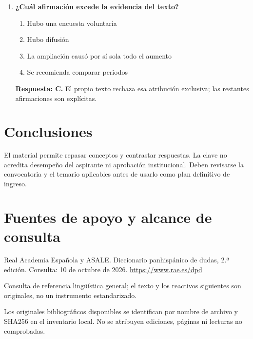 \begin{enumerate}
\begin{enumerate}[label=\Alph*)]
\item El horario no tuvo efecto alguno
\item Los costos fueron nulos
\end{enumerate}
\textbf{Respuesta: B.} Se reconoce una contribución posible, no resultados definitivos ni absolutos.
\item\textbf{¿Cuál afirmación excede la evidencia del texto?}
\begin{enumerate}[label=\Alph*)]
\item Hubo una encuesta voluntaria
\item Hubo difusión
\item La ampliación causó por sí sola todo el aumento
\item Se recomienda comparar periodos
\end{enumerate}
\textbf{Respuesta: C.} El propio texto rechaza esa atribución exclusiva; las restantes afirmaciones son explícitas.
\end{enumerate}

\section{Conclusiones}
El material permite repasar conceptos y contrastar respuestas. La clave no acredita desempeño del aspirante ni aprobación institucional. Deben revisarse la convocatoria y el temario aplicables antes de usarlo como plan definitivo de ingreso.
\clearpage\section{Fuentes de apoyo y alcance de consulta}
Real Academia Española y ASALE. Diccionario panhispánico de dudas, 2.ª edición. Consulta: 10 de octubre de 2026. \url{https://www.rae.es/dpd}\par Consulta de referencia lingüística general; el texto y los reactivos siguientes son originales, no un instrumento estandarizado.\par\medskip
Los originales bibliográficos disponibles se identifican por nombre de archivo y SHA256 en el inventario local. No se atribuyen ediciones, páginas ni lecturas no comprobadas.

